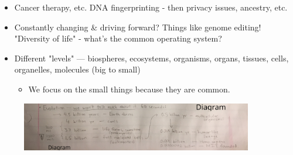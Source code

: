 \documentclass{article}
\begin{document}
\begin{itemize}
\item  Cancer therapy, etc.
DNA fingerprinting - then privacy issues, ancestry, etc.
\item  Constantly changing \& driving forward? Things like genome editing!
"Diversity of life" - what's the common operating system?
\end{itemize}
\begin{itemize}
\item  Different "levels" — biospheres, ecosystems, organisms, organs, tissues, cells,
organelles, molecules (big to small)
\begin{itemize}
\item  We focus on the small things because they are common.
\end{itemize}
\end{itemize}

                            \begin{figure}[H]
                            \includegraphics[width=0.9\textwidth]{q0q0.png}
                            \end{figure}
                            \newpage 
\end{document}
